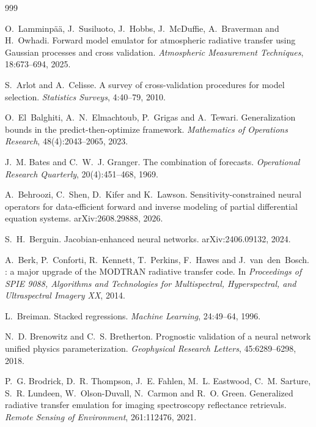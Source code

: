 \begin{thebibliography}{999}

O.~Lamminp\"a\"a, J.~Susiluoto, J.~Hobbs, J.~McDuffie, A.~Braverman and H.~Owhadi.
\newblock Forward model emulator for atmospheric radiative transfer using Gaussian processes and cross validation.
\newblock \emph{Atmospheric Measurement Techniques}, 18:673--694, 2025.

S.~Arlot and A.~Celisse.
\newblock A survey of cross-validation procedures for model selection.
\newblock \emph{Statistics Surveys}, 4:40--79, 2010.

O.~El~Balghiti, A.~N.~Elmachtoub, P.~Grigas and A.~Tewari.
\newblock Generalization bounds in the predict-then-optimize framework.
\newblock \emph{Mathematics of Operations Research}, 48(4):2043--2065, 2023.

J.~M. Bates and C.~W.~J. Granger.
\newblock The combination of forecasts.
\newblock \emph{Operational Research Quarterly}, 20(4):451--468, 1969.

A.~Behroozi, C.~Shen, D.~Kifer and K.~Lawson.
\newblock Sensitivity-constrained neural operators for data-efficient forward and inverse modeling of partial
differential equation systems.
\newblock arXiv:2608.29888, 2026.

S.~H.~Berguin.
\newblock Jacobian-enhanced neural networks.
\newblock arXiv:2406.09132, 2024.

A.~Berk, P.~Conforti, R.~Kennett, T.~Perkins, F.~Hawes and J.~van~den~Bosch.
: a major upgrade of the {MODTRAN} radiative transfer code.
\newblock In \emph{Proceedings of SPIE 9088, Algorithms and Technologies for Multispectral, Hyperspectral, and
Ultraspectral Imagery XX}, 2014.

L.~Breiman.
\newblock Stacked regressions.
\newblock \emph{Machine Learning}, 24:49--64, 1996.

N.~D. Brenowitz and C.~S. Bretherton.
\newblock Prognostic validation of a neural network unified physics parameterization.
\newblock \emph{Geophysical Research Letters}, 45:6289--6298, 2018.

P.~G. Brodrick, D.~R. Thompson, J.~E. Fahlen, M.~L. Eastwood, C.~M. Sarture, S.~R. Lundeen, W.~Olson-Duvall,
N.~Carmon and R.~O. Green.
\newblock Generalized radiative transfer emulation for imaging spectroscopy reflectance retrievals.
\newblock \emph{Remote Sensing of Environment}, 261:112476, 2021.


\end{thebibliography}
